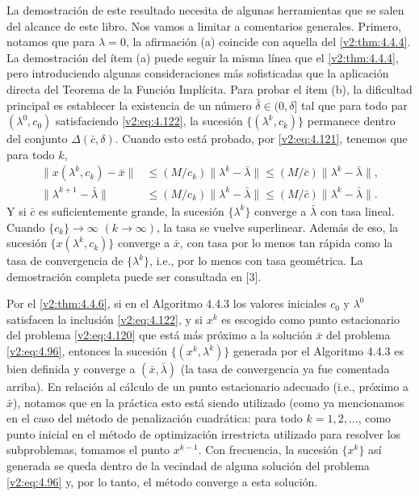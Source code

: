 La demostración de este resultado necesita de algunas herramientas que se salen del alcance de este libro. Nos vamos a limitar a comentarios generales. Primero, notamos que para $\lambda = 0$, la afirmación (a) coincide con aquella del \cref{v2:thm:4.4.4}. La demostración del ítem (a) puede seguir la misma línea que el \cref{v2:thm:4.4.4}, pero introduciendo algunas consideraciones más sofisticadas que la aplicación directa del Teorema de la Función Implícita. Para probar el ítem (b), la dificultad principal es establecer la existencia de un número $\bar{\delta} \in (0, \delta]$ tal que para todo par $(\lambda^0, c_0)$ satisfaciendo \eqref{v2:eq:4.122}, la sucesión $\{(\lambda^k, c_k)\}$ permanece dentro del conjunto $\Delta(\bar{c}, \delta)$. Cuando esto está probado, por \eqref{v2:eq:4.121}, tenemos que para todo $k$,
\begin{align*}
    \|x(\lambda^k, c_k) - \bar{x}\| &\le (M/c_k)\|\lambda^k - \bar{\lambda}\| \le (M/\bar{c})\|\lambda^k - \bar{\lambda}\|, \\
    \|\lambda^{k+1} - \bar{\lambda}\| &\le (M/c_k)\|\lambda^k - \bar{\lambda}\| \le (M/\bar{c})\|\lambda^k - \bar{\lambda}\|.
\end{align*}
Y si $\bar{c}$ es suficientemente grande, la sucesión $\{\lambda^k\}$ converge a $\bar{\lambda}$ con tasa lineal. Cuando $\{c_k\} \to \infty$ $(k \to \infty)$, la tasa se vuelve superlinear. Además de eso, la sucesión $\{x(\lambda^k, c_k)\}$ converge a $\bar{x}$, con tasa por lo menos tan rápida como la tasa de convergencia de $\{\lambda^k\}$, i.e., por lo menos con tasa geométrica. La demostración completa puede ser consultada en [3].

Por el \cref{v2:thm:4.4.6}, si en el Algoritmo 4.4.3 los valores iniciales $c_0$ y $\lambda^0$ satisfacen la inclusión \eqref{v2:eq:4.122}, y si $x^k$ es escogido como punto estacionario del problema \eqref{v2:eq:4.120} que está más próximo a la solución $\bar{x}$ del problema \eqref{v2:eq:4.96}, entonces la sucesión $\{(x^k, \lambda^k)\}$ generada por el Algoritmo 4.4.3 es bien definida y converge a $(\bar{x}, \bar{\lambda})$ (la tasa de convergencia ya fue comentada arriba). En relación al cálculo de un punto estacionario adecuado (i.e., próximo a $\bar{x}$), notamos que en la práctica esto está siendo utilizado (como ya mencionamos en el caso del método de penalización cuadrática: para todo $k = 1, 2, \dots$, como punto inicial en el método de optimización irrestricta utilizado para resolver los subproblemas, tomamos el punto $x^{k-1}$. Con frecuencia, la sucesión $\{x^k\}$ así generada se queda dentro de la vecindad de alguna solución del problema \eqref{v2:eq:4.96} y, por lo tanto, el método converge a esta solución.

